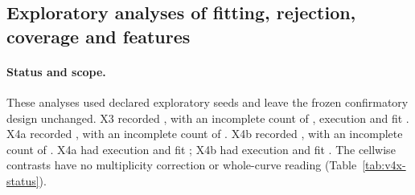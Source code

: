 
\subsection*{Exploratory analyses of fitting, rejection, coverage and features}\label{supp:x3-x7}
\paragraph{Status and scope.}
These analyses used declared exploratory seeds and leave the frozen confirmatory design unchanged.
X3 recorded  , with an incomplete count of  ,  execution  and  fit .
X4a recorded  , with an incomplete count of . X4b recorded  , with an incomplete count of .
X4a had  execution  and  fit ; X4b had  execution  and  fit .
The cellwise contrasts have no multiplicity correction or whole-curve reading (Table~\ref{tab:v4x-status}).

